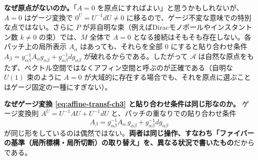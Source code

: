 \documentclass[uplatex, dvipdfmx, book]{jsbook}
\begin{document}
\textbf{なぜ原点がないのか。}「$A = 0$ を原点にすればよい」と思うかもしれないが、$A = 0$ はゲージ変換で $0^U = U^{-1}dU \neq 0$ に移るので、ゲージ不変な意味での特別な点ではない。さらに $P$ が非自明な束（例えばDiracモノポールやインスタントン数 $k \neq 0$ の束）では、$M$ 全体で $A = 0$ となる接続はそもそも存在しない。各パッチ上の局所表示 $A_\alpha$ はあっても、それらを全部 $0$ にすると貼り合わせ条件 $A_\beta = g_{\alpha\beta}^{-1}A_\alpha g_{\alpha\beta} + g_{\alpha\beta}^{-1}dg_{\alpha\beta}$ が破れるからである。したがって $\mathcal{A}$ は自然な原点をもたず、ベクトル空間ではなくアフィン空間と呼ぶのが正確である（自明な $U(1)$ 束のように $A=0$ が大域的に存在する場合でも、それを原点に選ぶことはゲージ固定の一種にすぎない）。

\textbf{なぜゲージ変換 \eqref{eq:affine-transf-ch3} と貼り合わせ条件は同じ形なのか。}
ゲージ変換則 $A^U = U^{-1}AU + U^{-1}dU$ と、パッチの重なりでの貼り合わせ条件
\begin{equation}
    A_\beta = g_{\alpha\beta}^{-1}A_\alpha\, g_{\alpha\beta} + g_{\alpha\beta}^{-1}dg_{\alpha\beta}
    \label{eq:patch-gluing-ch3}
\end{equation}
が同じ形をしているのは偶然ではない。\textbf{両者は同じ操作、すなわち「ファイバーの基準（局所標構・局所切断）の取り替え」を、異なる状況で書いたもの}だからである。
\end{document}
